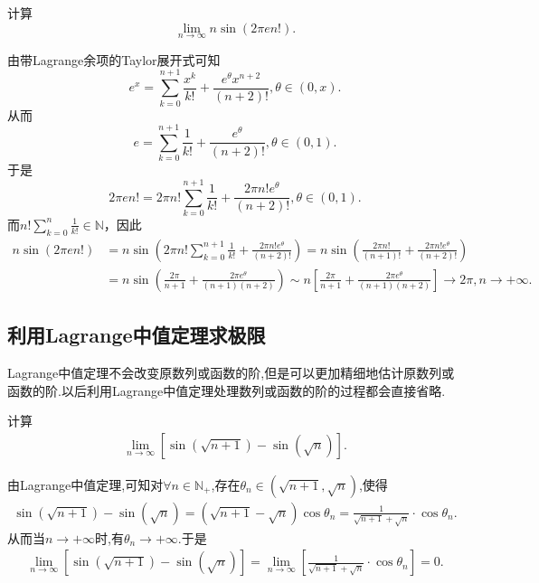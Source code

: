 \documentclass[lang=cn,newtx,10pt,scheme=chinese]{elegantbook}
\begin{document}
\begin{example}
计算
\[
\lim_{n\rightarrow \infty}n\sin(2\pi en!).
\]
\end{example}
\begin{solution}
由带Lagrange余项的Taylor展开式可知
\[
e^x = \sum_{k = 0}^{n + 1}\frac{x^k}{k!} + \frac{e^{\theta}x^{n + 2}}{(n + 2)!}, \theta \in (0, x).
\]
从而
\[
e = \sum_{k = 0}^{n + 1}\frac{1}{k!} + \frac{e^{\theta}}{(n + 2)!}, \theta \in (0, 1).
\]
于是
\[
2\pi en! = 2\pi n!\sum_{k = 0}^{n + 1}\frac{1}{k!} + \frac{2\pi n!e^{\theta}}{(n + 2)!}, \theta \in (0, 1).
\]
而\(n!\sum_{k = 0}^n\frac{1}{k!} \in \mathbb{N}\)，因此
\begin{align*}
n\sin(2\pi en!)&=n\sin\left(2\pi n!\sum_{k = 0}^{n + 1}\frac{1}{k!} + \frac{2\pi n!e^{\theta}}{(n + 2)!}\right)
=n\sin\left(\frac{2\pi n!}{(n + 1)!} + \frac{2\pi n!e^{\theta}}{(n + 2)!}\right)\\
&=n\sin\left(\frac{2\pi}{n + 1} + \frac{2\pi e^{\theta}}{(n + 1)(n + 2)}\right)
\sim n\left[\frac{2\pi}{n + 1} + \frac{2\pi e^{\theta}}{(n + 1)(n + 2)}\right] \to 2\pi, n \to +\infty.
\end{align*} 
\end{solution}


\subsection{利用Lagrange中值定理求极限}
Lagrange中值定理不会改变原数列或函数的阶,但是可以更加精细地估计原数列或函数的阶.以后利用Lagrange中值定理处理数列或函数的阶的过程都会直接省略.

\begin{example}
计算
\begin{align*}
\lim_{n \to \infty} [\sin(\sqrt{n + 1}) - \sin(\sqrt{n})].
\end{align*}
\end{example}
\begin{solution}
由Lagrange中值定理,可知对$\forall n\in\mathbb{N}_+$,存在$\theta_n \in(\sqrt{n+1},\sqrt{n})$,使得
\begin{align*}
\sin(\sqrt{n+1})-\sin(\sqrt{n})=(\sqrt{n+1}-\sqrt{n})\cos\theta_n=\frac{1}{\sqrt{n+1}+\sqrt{n}}\cdot \cos\theta_n.
\end{align*}
从而当$n\to +\infty$时,有$\theta_n \to +\infty$.于是
\begin{align*}
\lim_{n \to \infty} [\sin(\sqrt{n + 1}) - \sin(\sqrt{n})]=\lim_{n \to \infty} [\frac{1}{\sqrt{n+1}+\sqrt{n}}\cdot \cos\theta_n]=0.
\end{align*}
\end{solution}
\end{document}
